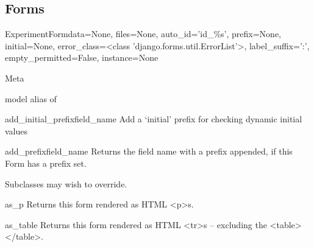 \documentclass[letterpaper,10pt,english]{sphinxmanual}
\begin{document}
\subsection{Forms}
\hypertarget{module-data.forms}{}
\modulesynopsis{}

\hypertarget{data.forms.ExperimentForm}{}\begin{classdesc}{ExperimentForm}{data=None, files=None, auto\_id='id\_\%s', prefix=None, initial=None, error\_class=\textless{}class 'django.forms.util.ErrorList'\textgreater{}, label\_suffix=':', empty\_permitted=False, instance=None}~

\hypertarget{data.forms.ExperimentForm.Meta}{}\begin{classdesc}{Meta}{}~

\hypertarget{data.forms.ExperimentForm.Meta.model}{}\begin{memberdesc}{model}
alias of 
\end{memberdesc}
\end{classdesc}

\hypertarget{data.forms.ExperimentForm.add_initial_prefix}{}\begin{methoddesc}[ExperimentForm]{add\_initial\_prefix}{field\_name}
Add a `initial' prefix for checking dynamic initial values
\end{methoddesc}

\hypertarget{data.forms.ExperimentForm.add_prefix}{}\begin{methoddesc}[ExperimentForm]{add\_prefix}{field\_name}
Returns the field name with a prefix appended, if this Form has a
prefix set.

Subclasses may wish to override.
\end{methoddesc}

\hypertarget{data.forms.ExperimentForm.as_p}{}\begin{methoddesc}[ExperimentForm]{as\_p}{}
Returns this form rendered as HTML \textless{}p\textgreater{}s.
\end{methoddesc}

\hypertarget{data.forms.ExperimentForm.as_table}{}\begin{methoddesc}[ExperimentForm]{as\_table}{}
Returns this form rendered as HTML \textless{}tr\textgreater{}s -- excluding the \textless{}table\textgreater{}\textless{}/table\textgreater{}.
\end{methoddesc}


\end{classdesc}
\end{document}
